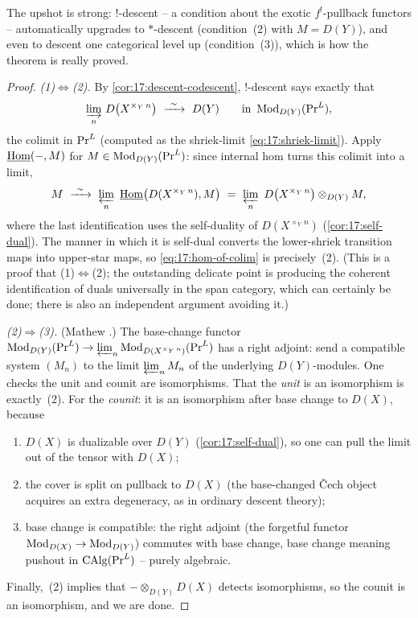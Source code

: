 The upshot is strong: $!$-descent -- a condition about the exotic $f^{!}$-pullback functors --
automatically upgrades to $*$-descent (condition~(2) with $M=D(Y)$), and even to descent one
categorical level up (condition~(3)), which is how the theorem is really proved.

\begin{proof}
\emph{(1)$\Leftrightarrow$(2).} By \cref{cor:17:descent-codescent}, $!$-descent says exactly
that
\[
\varinjlim_{n}\,D\bigl(X^{\times_{Y}\,n}\bigr)\ \xrightarrow{\ \sim\ }\ D(Y)\qquad\text{in }\Mod_{D(Y)}(\PrL),
\]
the colimit in $\mathrm{Pr}^{L}$ (computed as the shriek-limit \eqref{eq:17:shriek-limit}). Apply
$\underline{\operatorname{Hom}}(-,M)$ for $M\in\operatorname{Mod}_{D(Y)}(\mathrm{Pr}^{L})$: since internal hom turns this colimit
into a limit,
\begin{equation}
\label{eq:17:hom-of-colim}
M\ \xrightarrow{\ \sim\ }\ \varprojlim_{n}\ \underline{\Homop}\bigl(D(X^{\times_{Y}\,n}),M\bigr)
\ =\ \varprojlim_{n}\ D\bigl(X^{\times_{Y}\,n}\bigr)\otimes_{D(Y)}M,
\end{equation}
where the last identification uses the self-duality of $D(X^{\times_{Y}\,n})$
(\cref{cor:17:self-dual}). The manner in which it is self-dual converts the lower-shriek
transition maps into upper-star maps, so \eqref{eq:17:hom-of-colim} is precisely~(2). (This
is a proof that (1)$\Leftrightarrow$(2); the outstanding delicate point is producing the
coherent identification of duals universally in the span category, which can certainly be
done; there is also an independent argument avoiding it.)

\emph{(2)$\Rightarrow$(3).} (Mathew \cite{mathew2016galoisgroupstablehomotopy}.) The
base-change functor $\operatorname{Mod}_{D(Y)}(\mathrm{Pr}^{L})\to\varprojlim_{n}\operatorname{Mod}_{D(X^{\times_{Y}\,n})}(\mathrm{Pr}^{L})$
has a right adjoint: send a compatible system $(M_{n})$ to the limit $\varprojlim_{n}M_{n}$
of the underlying $D(Y)$-modules. One checks the unit and counit are isomorphisms. That the
\emph{unit} is an isomorphism is exactly~(2). For the \emph{counit}: it is an isomorphism
after base change to $D(X)$, because
\begin{enumerate}
\item[(i)] $D(X)$ is dualizable over $D(Y)$ (\cref{cor:17:self-dual}), so one can pull the
limit out of the tensor with $D(X)$;
\item[(ii)] the cover is split on pullback to $D(X)$ (the base-changed \v{C}ech object acquires
an extra degeneracy, as in ordinary descent theory);
\item[(iii)] base change is compatible: the right adjoint (the forgetful functor
$\operatorname{Mod}_{D(X)}\to\operatorname{Mod}_{D(Y)}$) commutes with base change, base change meaning pushout in
$\operatorname{CAlg}(\mathrm{Pr}^{L})$ -- purely algebraic.
\end{enumerate}
Finally,~(2) implies that $-\otimes_{D(Y)}D(X)$ detects isomorphisms, so the counit is an
isomorphism, and we are done.


\end{proof}
